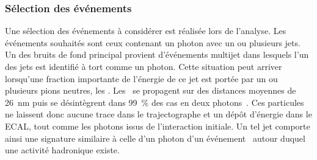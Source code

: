 \subsubsection{Sélection des événements}
Une sélection des événements à considérer est réalisée lors de l'analyse.
Les événements souhaités sont ceux contenant un photon avec un ou plusieurs jets.
Un des bruits de fond principal provient d'événements multijet dans lesquels l'un des jets est identifié à tort comme un photon.
Cette situation peut arriver lorsqu'une fraction importante de l'énergie de ce jet est portée par un ou plusieurs pions neutres, les \pionnull.
Les \pionnull\ se propagent sur des distances moyennes de \SI{26}{\nano\meter} puis se désintègrent dans \SI{99}{\%} des cas en deux photons~\cite{PDG_booklet_2020}.
Ces particules ne laissent donc aucune trace dans le trajectographe et un dépôt d'énergie dans le ECAL, tout comme les photons issus de l'interaction initiale.
Un tel jet comporte ainsi une signature similaire à celle d'un photon d'un événement \Gjet\ autour duquel une activité hadronique existe.
